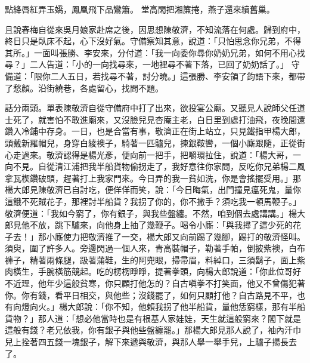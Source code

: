 \begin{showcontents}{}
點絳唇紅弄玉嬌，鳳凰飛下品鸞簫。
堂高閑把湘簾捲，燕子還來續舊巢。

且說春梅自從來吳月娘家赴席之後，因思想陳敬濟，不知流落在何處。歸到府中，終日只是臥床不起，心下沒好氣。守備察知其意，說道：「只怕思念你兄弟，不得其所。」一面叫張勝、李安來，分付道：「我一向委你尋你奶奶兄弟，如何不用心找尋？」二人告道：「小的一向找尋來，一地裡尋不著下落，已回了奶奶話了。」 守備道：「限你二人五日，若找尋不著，討分曉。」這張勝、李安領了鈞語下來，都帶了愁顏。沿街繞巷，各處留心，找問不題。

話分兩頭。單表陳敬濟自從守備府中打了出來，欲投宴公廟。又聽見人說師父任道士死了，就害怕不敢進廟來，又沒臉兒見杏庵主老，白日里到處打油飛，夜晚間還鑽入冷鋪中存身。一日，也是合當有事，敬濟正在街上站立，只見鐵指甲楊大郎，頭戴新羅帽兒，身穿白綾襖子，騎著一匹驢兒，揀銀鞍轡，一個小廝跟隨，正從街心走過來。敬濟認得是楊光彥，便向前一把手，把嚼環拉住，說道：「楊大哥，一向不見。自從清江浦把我半船貨物偷拐走了，我好意往你家問，反吃你兄弟楊二風拿瓦楔鑽破頭，趕著打上我家門來。今日弄的我一貧如洗，你是會搖擺受用。」那楊大郎見陳敬濟已自討吃，便佯佯而笑，說：「今日晦氣，出門撞見瘟死鬼，量你這餓不死賊花子，那裡討半船貨？我拐了你的，你不撒手？須吃我一頓馬鞭子。」敬濟便道：「我如今窮了，你有銀子，與我些盤纏。不然，咱到個去處講講。」楊大郎見他不放，跳下驢來，向他身上抽了幾鞭子。喝令小廝：「與我撏了這少死的花子去！」那小廝使力把敬濟推了一交，楊大郎又向前踢了幾腳，踢打的敬濟怪叫。須臾，圍了許多人。旁邊閃過一個人來，青高裝帽子，勒著手帕，倒披紫襖，白布褲子，精著兩條腿，趿著蒲鞋，生的阿兜眼，掃帚眉，料綽口，三須鬍子，面上紫肉橫生，手腕橫筋競起。吃的楞楞睜睜，提著拳頭，向楊大郎說道：「你此位哥好不近理，他年少這般貧寒，你只顧打他怎的？自古嗔拳不打笑面，他又不曾傷犯著你。你有錢，看平日相交，與他些；沒錢罷了，如何只顧打他？自古路見不平，也有向燈向火。」楊大郎說：「你不知，他賴我拐了他半船貨，量他恁窮樣，那有半船貨物？」那人道：「想必他當時也是有根基人家娃娃，天生就這般窮來？閣下就是這般有錢？老兄依我，你有銀子與他些盤纏罷。」那楊大郎見那人說了，袖內汗巾兒上拴著四五錢一塊銀子，解下來遞與敬濟，與那人舉一舉手兒，上驢子揚長去了。


\end{showcontents}
